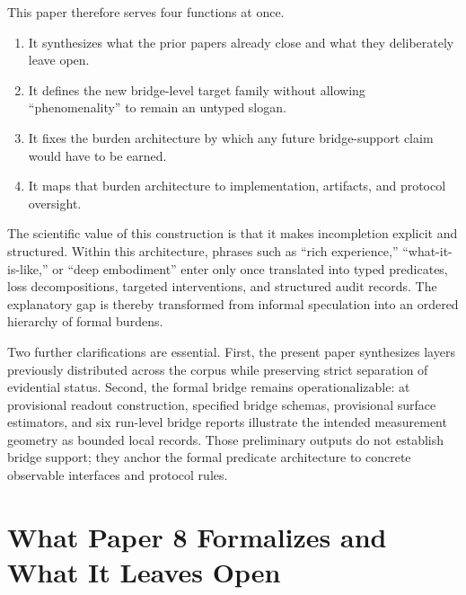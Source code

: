 \documentclass[11pt,a4paper]{article}
\theoremstyle{definition}
\begin{document}
This paper therefore serves four functions at once.
\begin{enumerate}[leftmargin=1.5em]
\item It synthesizes what the prior papers already close and what they deliberately leave open.
\item It defines the new bridge-level target family without allowing ``phenomenality'' to remain an untyped slogan.
\item It fixes the burden architecture by which any future bridge-support claim would have to be earned.
\item It maps that burden architecture to implementation, artifacts, and protocol oversight.
\end{enumerate}

The scientific value of this construction is that it makes incompletion explicit and structured. Within this architecture, phrases such as ``rich experience,'' ``what-it-is-like,'' or ``deep embodiment'' enter only once translated into typed predicates, loss decompositions, targeted interventions, and structured audit records. The explanatory gap is thereby transformed from informal speculation into an ordered hierarchy of formal burdens.

Two further clarifications are essential. First, the present paper synthesizes layers previously distributed across the corpus while preserving strict separation of evidential status. Second, the formal bridge remains operationalizable: at provisional readout construction, specified bridge schemas, provisional surface estimators, and six run-level bridge reports illustrate the intended measurement geometry as bounded local records. Those preliminary outputs do not establish bridge support; they anchor the formal predicate architecture to concrete observable interfaces and protocol rules.

\section{What Paper 8 Formalizes and What It Leaves Open}
\end{document}
